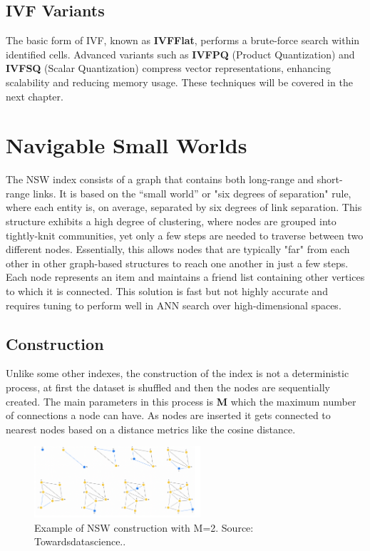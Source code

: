 \subsection{IVF Variants}
The basic form of IVF, known as \textbf{IVFFlat}, performs a brute-force search within identified cells. Advanced variants such as \textbf{IVFPQ} (Product Quantization) and \textbf{IVFSQ} (Scalar Quantization) compress vector representations, enhancing scalability and reducing memory usage. These techniques will be covered in the next chapter.


\section{Navigable Small Worlds}
The NSW index consists of a graph that contains both long-range and short-range links. It is based on the “small world” or "six degrees of separation" rule, where each entity is, on average, separated by six degrees of link separation. This structure exhibits a high degree of clustering, where nodes are grouped into tightly-knit communities, yet only a few steps are needed to traverse between two different nodes. Essentially, this allows nodes that are typically "far" from each other in other graph-based structures to reach one another in just a few steps. Each node represents an item and maintains a friend list containing other vertices to which it is connected. This solution is fast but not highly accurate and requires tuning to perform well in ANN search over high-dimensional spaces.

\subsection{Construction}
Unlike some other indexes, the construction of the index is not a deterministic process, at first the dataset is shuffled and then the nodes are sequentially created. The main parameters in this process is  \textbf{M} which the maximum number of connections a node can have. As nodes are inserted it gets connected to nearest nodes based on a distance metrics like the cosine distance.

\begin{figure}[h]
    \centering
\includegraphics[width=0.55\textwidth]{IMAGES/immagine_2025-02-27_132644429.png}
    \caption[NSW construction]{Example of NSW construction with M=2. Source: Towardsdatascience.\footnotemark.}
    \label{fig:NSW}
\end{figure}


